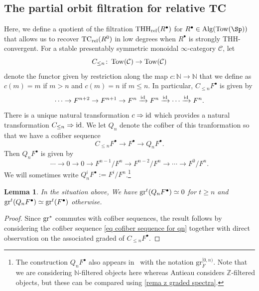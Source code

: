 \documentclass[english,10pt]{amsart}
\newcommand{\rel}{\textup{rel}}
\newtheorem{lem}{Lemma}[section]
\theoremstyle{definition}
\numberwithin{equation}{section}
\newcommand{\rtc}{\mathrm{TC}_{\rel}}
\newcommand{\rthh}{\mathrm{THH}_{\rel}}
\newcommand{\Tow}{\mathrm{Tow}}
\newcommand{\Alg}{\mathrm{Alg}}
\def\co{\colon\thinspace}
\newcommand{\gr}{\textup{gr}^*}
\begin{document}
\subsection{The partial orbit filtration for relative TC}\label{sec partial orbit filtration for tcrel}

Here, we define a quotient of the filtration $\rthh(R^{\bullet})$ for $R^{\bullet}\in \Alg(\Tow(\Sp))$ that allows us to recover $\rtc(R^0)$ in low degrees when $R^{\bullet}$ is strongly THH-convergent. For a stable presentably symmetric monoidal $\infty$-category  $\mathcal{C}$, let 
\[C_{\leq n} \co \mathrm{Tow}(\mathcal{C}) \to \mathrm{Tow}(\mathcal{C})\]
denote the functor given by restriction along the map $c: \mathbb{N} \to \mathbb{N}$ that we define as $c(m) = m$ if $m>n$ and $c(m) = n$ if $m \leq n$. In particular, ${C}_{\leq n}F^\bullet$ is given by
\[\cdots \to  F^{n+2} \to F^{n+1} \to F^n \xrightarrow{\textup{id}} F^{n} \xrightarrow{\textup{id}} \cdots \xrightarrow{\textup{id}} F^n. \]
There is a unique natural transformation $c \Rightarrow \textup{id}$ which provides a natural transformation ${C}_{\leq n} \Rightarrow \textup{id}$. We let ${Q}_n$ denote the cofiber of this tranformation so that we have a cofiber sequence
\begin{equation}\label{eq cofiber sequence for qn}
{C}_{\leq n} F^\bullet \to F^\bullet \to {Q}_n F^\bullet.
\end{equation}
Then ${Q}_n F^\bullet$ is given by 
\[\cdots \to 0 \to 0 \to F^{n-1}/F^n \to F^{n-2}/F^n \to \cdots \to F^0/F^n.\]
We will sometimes write ${Q}_n^i F^\bullet :=F^i/F^n$.\footnote{The construction $Q_nF^{\bullet}$ also appears in~\cite[Construction~3.17]{Ant24} with the notation $\mathrm{gr}_{F}^{[0,n)}$. Note that we are considering $\mathbb{N}$-filtered objects here whereas Antieau considers $\mathbb{Z}$-filtered objects, but these can be compared using \autoref{rema z graded spectra}.}

\begin{lem}\label{lemm associated graded of qn}
In the situation above, We have $\textup{gr}^t(Q_nF^\bullet) \simeq 0$ for $t\geq n$ and $\textup{gr}^t(Q_nF^\bullet) \simeq \textup{gr}^t(F^\bullet)$ otherwise.
\end{lem}
\begin{proof}
Since $\gr$ commutes with cofiber sequences, the result follows by considering the cofiber sequence \eqref{eq cofiber sequence for qn} together with direct observation on the associated graded of $C_{\leq n} F^\bullet$.
\end{proof}
\end{document}
